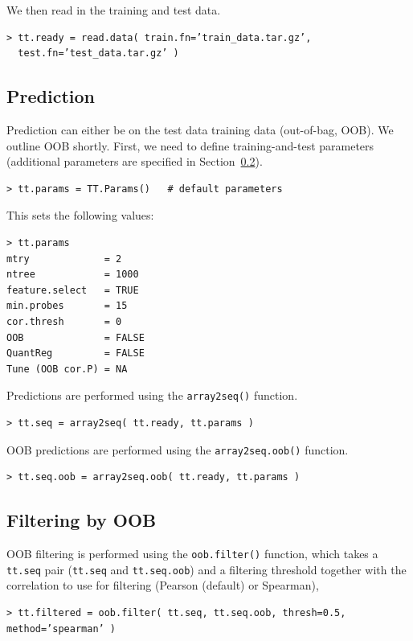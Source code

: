 \documentclass[a4paper,12pt]{article}
\begin{document}
We then read in the training and test data.

\begin{verbatim}
> tt.ready = read.data( train.fn=’train_data.tar.gz’, 
  test.fn=’test_data.tar.gz’ )
\end{verbatim}

\subsection{Prediction}

Prediction can either be on the test data training data (out-of-bag, OOB). We outline OOB shortly. First, we need to define training-and-test parameters (additional parameters are specified in Section~\ref{}).
	
\begin{verbatim}
> tt.params = TT.Params()	# default parameters
\end{verbatim} 

This sets the following values:

\begin{verbatim}
> tt.params
mtry             = 2 
ntree            = 1000 
feature.select   = TRUE 
min.probes       = 15 
cor.thresh       = 0 
OOB              = FALSE 
QuantReg         = FALSE 
Tune (OOB cor.P) = NA
\end{verbatim}

Predictions are performed using the \texttt{array2seq()} function.

\begin{verbatim}
> tt.seq = array2seq( tt.ready, tt.params )
\end{verbatim}

OOB predictions are performed using the \texttt{array2seq.oob()} function.

\begin{verbatim}
> tt.seq.oob = array2seq.oob( tt.ready, tt.params )
\end{verbatim} 

\subsection{Filtering by OOB}

OOB filtering is performed using the \texttt{oob.filter()} function, which takes a \texttt{tt.seq} pair (\texttt{tt.seq} and \texttt{tt.seq.oob}) and a filtering threshold together with the correlation to use for filtering (Pearson (default) or Spearman),
	
\begin{verbatim}
> tt.filtered = oob.filter( tt.seq, tt.seq.oob, thresh=0.5, method=’spearman’ )
\end{verbatim}
\end{document}
